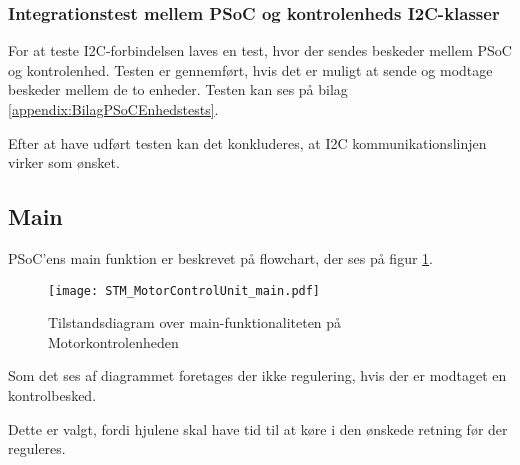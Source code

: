 \subsubsection{Integrationstest mellem PSoC og kontrolenheds I2C-klasser}
For at teste I2C-forbindelsen laves en test, hvor der sendes beskeder mellem PSoC og kontrolenhed.
Testen er gennemført, hvis det er muligt at sende og modtage beskeder mellem de to enheder. 
Testen kan ses på bilag \ref{appendix:BilagPSoCEnhedstests}.

Efter at have udført testen kan det konkluderes, at I2C kommunikationslinjen virker som ønsket.

\subsection{Main}
PSoC'ens main funktion er beskrevet på flowchart, der ses på figur \ref{fig:STM_MotorControlUnit_main}. 
\begin{figure}[H]  %
\centering
\texttt{[image: STM\_MotorControlUnit\_main.pdf]}
\caption{Tilstandsdiagram over main-funktionaliteten på Motorkontrolenheden}
\label{fig:STM_MotorControlUnit_main}
\end{figure}

Som det ses af diagrammet foretages der ikke regulering, hvis der er modtaget en kontrolbesked. 

Dette er valgt, fordi hjulene skal have tid til at køre i den ønskede retning før der reguleres.


%